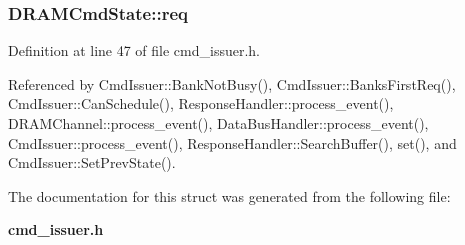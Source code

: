 \subsubsection[{req}]{ {\bf DRAMCmdState::req}}\label{structDRAMCmdState_73c981a3f268676ad91084cd9d01e262}




Definition at line 47 of file cmd\_\-issuer.h.

Referenced by CmdIssuer::BankNotBusy(), CmdIssuer::BanksFirstReq(), CmdIssuer::CanSchedule(), ResponseHandler::process\_\-event(), DRAMChannel::process\_\-event(), DataBusHandler::process\_\-event(), CmdIssuer::process\_\-event(), ResponseHandler::SearchBuffer(), set(), and CmdIssuer::SetPrevState().

The documentation for this struct was generated from the following file:\begin{CompactItemize}
\item 
{\bf cmd\_\-issuer.h}\end{CompactItemize}
